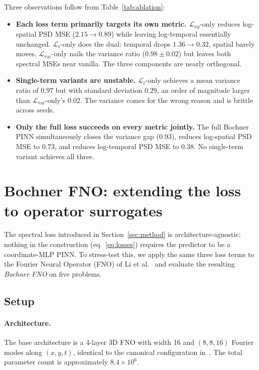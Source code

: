 \documentclass[10pt]{elsarticle}
\begin{document}
Three observations follow from Table~\ref{tab:ablation}:
\begin{itemize}
\item \textbf{Each loss term primarily targets its own metric.}
$\mathcal{L}_{xy}$-only reduces log-spatial PSD MSE
($2.15 \to 0.89$) while leaving log-temporal essentially unchanged.
$\mathcal{L}_{t}$-only does the dual: temporal drops
$1.36 \to 0.32$, spatial barely moves.
$\mathcal{L}_{\mathrm{var}}$-only nails the variance ratio
($0.98 \pm 0.02$) but leaves both spectral MSEs near vanilla.
The three components are nearly orthogonal.

\item \textbf{Single-term variants are unstable.}
$\mathcal{L}_{t}$-only achieves a mean variance ratio of $0.97$
but with standard deviation $0.29$, an order of magnitude larger
than $\mathcal{L}_{\mathrm{var}}$-only's $0.02$. The variance
comes for the wrong reason and is brittle across seeds.

\item \textbf{Only the full loss succeeds on every metric jointly.}
The full Bochner PINN simultaneously closes the variance gap
($0.93$), reduces log-spatial PSD MSE to $0.73$, and reduces
log-temporal PSD MSE to $0.38$. No single-term variant achieves
all three.
\end{itemize}


\section{Bochner FNO: extending the loss to operator surrogates}
\label{sec:spectral-fno}

The spectral loss introduced in Section~\ref{sec:method} is
architecture-agnostic: nothing in the construction
(eq.~\ref{eq:losses}) requires the predictor to be a coordinate-MLP
PINN. To stress-test this, we apply the same three loss terms to
the Fourier Neural Operator (FNO) of Li et al.~\cite{Li2021FNO}
and evaluate the resulting \emph{Bochner FNO} on five problems.

\subsection{Setup}
\label{subsec:fno-setup}

\paragraph{Architecture.}
The base architecture is a 4-layer 3D FNO with width 16 and
$(8, 8, 16)$ Fourier modes along $(x, y, t)$, identical to the
canonical configuration in~\cite{Li2021FNO}. The total parameter
count is approximately $8.4 \times 10^{6}$.
\end{document}
